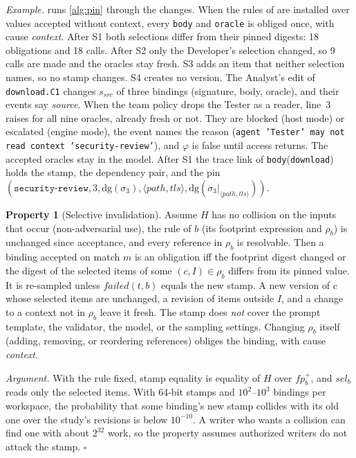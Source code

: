 \documentclass[10pt,conference]{IEEEtran}
\theoremstyle{definition}
\newtheorem{proposition}{Property}
\newcommand{\code}[1]{\texttt{#1}}
\newcommand{\fp}{\mathit{fp}}
\newcommand{\dig}{\mathrm{dg}}
\newcommand{\sel}{\mathit{sel}}
\begin{document}
\emph{Example.}  runs \cref{alg:pin} through the changes. When the rules of
 are installed over values accepted without context, every \code{body} and \code{oracle} is
obliged once, with cause \emph{context}. After S1 both selections differ from their pinned digests: 18
obligations and 18 calls. After S2 only the Developer's selection changed, so 9 calls are made and the oracles
stay fresh. S3 adds an item that neither selection names, so no stamp changes. S4 creates no version. The
Analyst's edit of \code{download.C1} changes $s_{\mathit{src}}$ of three bindings (signature, body, oracle),
and their events say \emph{source}. When the team policy drops the Tester as a reader, line~3 raises for all
nine oracles, already fresh or not. They are blocked (host mode) or escalated (engine mode), the event names
the reason (\code{agent 'Tester' may not read context 'security-review'}), and $\varphi$ is false until access
returns. The accepted oracles stay in the model. After S1 the trace link of \code{body}(\code{download}) holds
the stamp, the dependency pair, and the pin $(\code{security-review}, 3, \dig(\sigma_3),
\langle\mathit{path},\mathit{tls}\rangle, \dig(\sigma_3|_{\langle\mathit{path},\mathit{tls}\rangle}))$.

\begin{proposition}[Selective invalidation]\label{prop:selective}
Assume $H$ has no collision on the inputs that occur (non-adversarial use), the rule of $b$ (its footprint
expression and $\rho_b$) is unchanged since acceptance, and every reference in $\rho_b$ is resolvable. Then a
binding accepted on match $m$ is an obligation iff the footprint digest changed or the digest of the selected
items of some $(c,I)\in\rho_b$ differs from its pinned value. It is re-sampled unless $\mathit{failed}(t,b)$
equals the new stamp. A new version of $c$ whose selected items are unchanged, a revision of items outside
$I$, and a change to a context not in $\rho_b$ leave it fresh. The stamp does \emph{not} cover the prompt
template, the validator, the model, or the sampling settings. Changing $\rho_b$ itself (adding, removing, or
reordering references) obliges the binding, with cause \emph{context}.
\end{proposition}
\noindent\emph{Argument.} With the rule fixed, stamp equality is equality of $H$ over $\fp^{+}_b$, and
$\sel_b$ reads only the selected items. With 64-bit stamps and $10^2$--$10^3$ bindings per workspace, the
probability that some binding's new stamp collides with its old one over the study's revisions is below
$10^{-10}$. A writer who wants a collision can find one with about $2^{32}$ work, so the property assumes
authorized writers do not attack the stamp. \hfill$\square$
\end{document}
